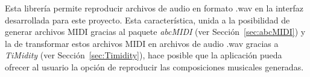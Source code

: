Esta librería permite reproducir archivos de audio en formato .wav en la interfaz desarrollada para este proyecto. Esta característica, unida a la posibilidad de generar archivos MIDI gracias al paquete \emph{abcMIDI} (ver Sección~\ref{sec:abcMIDI}) y la de transformar estos archivos MIDI en archivos de audio .wav gracias a \emph{TiMidity} (ver Sección~\ref{sec:Timidity}), hace posible que la aplicación pueda ofrecer al usuario la opción de reproducir las composiciones musicales generadas.